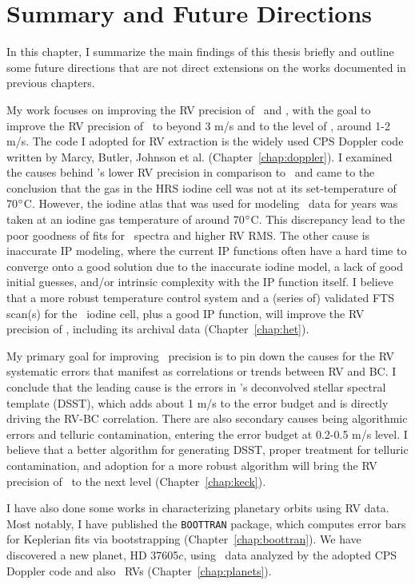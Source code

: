 \chapter{Summary and Future Directions}\label{chap:conclusion}

In this chapter, I summarize the main findings of this thesis briefly
and outline some future directions that are not direct extensions on the
works documented in previous chapters.

My work focuses on improving the RV precision of \het\ and \keck, with
the goal to improve the RV precision of \het\ to beyond 3 m/s and to
the level of \keck, around 1-2 m/s. The code I adopted for RV extraction
is the widely used CPS Doppler code written by Marcy, Butler, Johnson
et al. (Chapter~\ref{chap:doppler}). I examined the causes behind
\het's lower RV precision in comparison to \keck\ and came to the
conclusion that the gas in the HRS iodine cell was not at its
set-temperature of 70$^{\circ}$C. However, the iodine atlas that was
used for modeling \het\ data for years was taken at an iodine gas
temperature of around 70$^{\circ}$C. This discrepancy lead to the poor
goodness of fits for \het\ spectra and higher RV RMS. The other cause
is inaccurate IP modeling, where the current IP functions often have a
hard time to converge onto a good solution due to the inaccurate
iodine model, a lack of good initial guesses, and/or intrinsic
complexity with the IP function itself. I believe that a more robust
temperature control system and a (series of) validated FTS scan(s) for
the \het\ iodine cell, plus a good IP function, will improve the RV
precision of \het, including its archival data (Chapter~\ref{chap:het}).

My primary goal for improving \keck\ precision is to pin down the
causes for the RV systematic errors that manifest as correlations or
trends between RV and BC. I conclude that the leading cause is the
errors in \keck's deconvolved stellar spectral template (DSST), which
adds about 1 m/s to the error budget and is directly driving the RV-BC
correlation. There are also secondary causes being algorithmic errors
and telluric contamination, entering the error budget at 0.2-0.5 m/s
level. I believe that a better algorithm for generating DSST, proper
treatment for telluric contamination, and adoption for a more robust
algorithm will bring the RV precision of \keck\ to the next level
(Chapter~\ref{chap:keck}). 

I have also done some works in characterizing planetary orbits using
RV data. Most notably, I have published the {\tt BOOTTRAN} package,
which computes error bars for Keplerian fits via bootstrapping
(Chapter~\ref{chap:boottran}). We have discovered a new planet, HD
37605$c$, using \het\ data analyzed by the adopted CPS Doppler code
and also \keck\ RVs (Chapter~\ref{chap:planets}).

